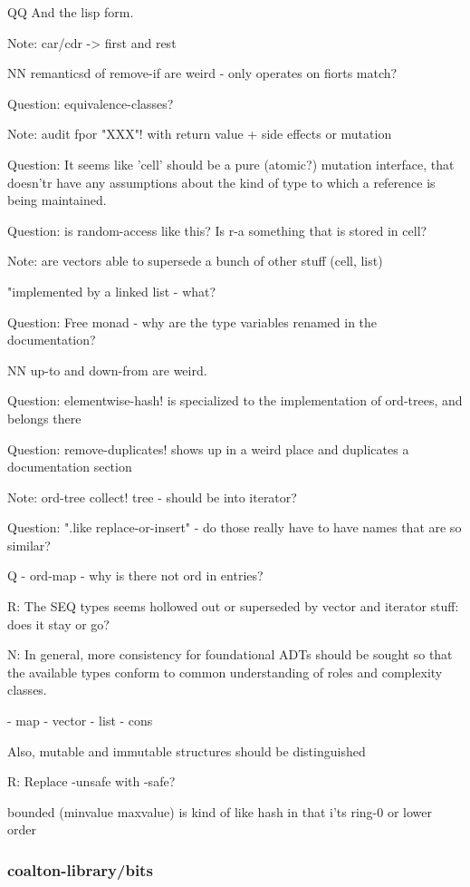 \documentclass[12pt]{article}
\begin{document}
QQ And the lisp form.

Note: car/cdr -> first and rest

NN remanticsd of remove-if are weird - only operates on  fiorts match?

Question: equivalence-classes?

Note: audit fpor "XXX"! with return value + side effects or mutation

Question: It seems like 'cell' should be a pure (atomic?) mutation interface, that doesn'tr have any assumptions about the kind of type to which a reference is being maintained.

Question: is random-access like this? Is r-a something that is stored in cell?

Note: are vectors able to supersede a bunch of other stuff (cell, list)

"implemented by a linked list - what?

Question: Free monad - why are the type variables renamed in the documentation?

NN up-to and down-from are weird.

Question: elementwise-hash! is specialized to the implementation of ord-trees, and belongs there

Question: remove-duplicates! shows up in a weird place and duplicates a documentation section

Note: ord-tree collect! tree - should be into iterator?

Question: ".like replace-or-insert" - do those really have to have names that are so similar?

Q - ord-map - why is there not ord in entries?

R: The SEQ types seems hollowed out or superseded by vector and iterator stuff: does it stay or go?

N: In general, more consistency for foundational ADTs should be sought so that the available types conform to common understanding of roles and complexity classes.

  - map
  - vector
  - list
  - cons

Also, mutable and immutable structures should be distinguished

R: Replace -unsafe with -safe?

bounded (minvalue maxvalue) is kind of like hash in that i'ts ring-0 or lower order

\subsubsection{coalton-library/bits}
\end{document}
